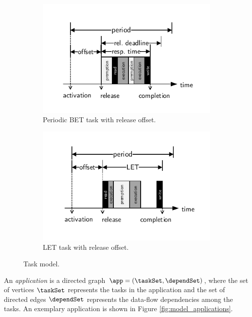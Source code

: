 \begin{figure}
\centering
%
\begin{subfigure}[t]{0.45\textwidth}
	\includegraphics[trim=0.5cm 0.5cm 0.5cm 0.5cm, width=\textwidth]{fig/paper/model_task.pdf}
	\caption{Periodic BET task with release offset.}
	\label{fig:et_task}
\end{subfigure}
%
\hfill
%
\begin{subfigure}[t]{0.45\textwidth}
	\includegraphics[trim=0.5cm 0.5cm 0.5cm 0.5cm, width=\textwidth]{fig/paper/model_task_let.pdf}
	\caption{LET task with release offset.}
	\label{fig:let_task}
\end{subfigure}
%
\caption{Task model.}
\label{fig:task}
\end{figure}


An \emph{application} is a directed graph $\app = (\taskSet, \dependSet)$, where the set of vertices $\taskSet$ represents the tasks in the application and the set of directed edges $\dependSet$ represents the data-flow dependencies among the tasks. 
An exemplary application is shown in Figure \ref{fig:model_applications}.
\bigskip

